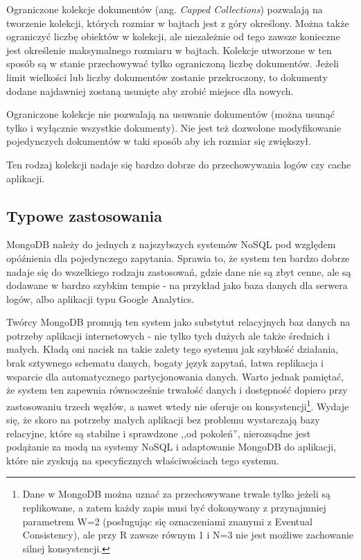 Ograniczone kolekcje dokumentów (ang. \emph{Capped Collections}) pozwalają na tworzenie kolekcji, których rozmiar w bajtach jest z góry określony.
Można także ograniczyć liczbę obiektów w kolekcji, ale niezależnie od tego zawsze konieczne jest określenie maksymalnego rozmiaru w bajtach.
Kolekcje utworzone w ten sposób są w stanie przechowywać tylko ograniczoną liczbę dokumentów.
Jeżeli limit wielkości lub liczby dokumentów zostanie przekroczony, to dokumenty dodane najdawniej zostaną usunięte aby zrobić miejsce dla nowych.

Ograniczone kolekcje nie pozwalają na usuwanie dokumentów (można usunąć tylko i wyłącznie wszystkie dokumenty).
Nie jest też dozwolone modyfikowanie pojedynczych dokumentów w taki sposób aby ich rozmiar się zwiększył.

Ten rodzaj kolekcji nadaje się bardzo dobrze do przechowywania logów czy cache aplikacji.

\subsection*{Typowe zastosowania}

MongoDB należy do jednych z najszybszych systemów NoSQL pod względem opóźnienia dla pojedynczego zapytania.
Sprawia to, że system ten bardzo dobrze nadaje się do wszelkiego rodzaju zastosowań, gdzie dane nie są zbyt cenne, ale są dodawane w bardzo szybkim tempie - na przykład jako baza danych dla serwera logów, albo aplikacji typu Google Analytics.

Twórcy MongoDB promują ten system jako substytut relacyjnych baz danych na potrzeby aplikacji internetowych - nie tylko tych dużych ale także średnich i małych.
Kładą oni nacisk na takie zalety tego systemu jak szybkość działania, brak sztywnego schematu danych, bogaty język zapytań, łatwa replikacja i wsparcie dla automatycznego partycjonowania danych.
Warto jednak pamiętać, że system ten zapewnia równocześnie trwałość danych i dostępność dopiero przy zastosowaniu trzech węzłów, a nawet wtedy nie oferuje on konsystencji\footnote{Dane w MongoDB można uznać za przechowywane trwale tylko jeżeli są replikowane, a zatem każdy zapis musi być dokonywany z przynajmniej parametrem W=2 (posługując się oznaczeniami znanymi z Eventual Consistency), ale przy R zawsze równym 1 i N=3 nie jest możliwe zachowanie silnej konsystencji.}.
Wydaje się, że skoro na potrzeby małych aplikacji bez problemu wystarczają bazy relacyjne, które są stabilne i sprawdzone ,,od pokoleń'', nierozsądne jest podążanie za modą na systemy NoSQL i adaptowanie MongoDB do aplikacji, które nie zyskują na specyficznych właściwościach tego systemu.


